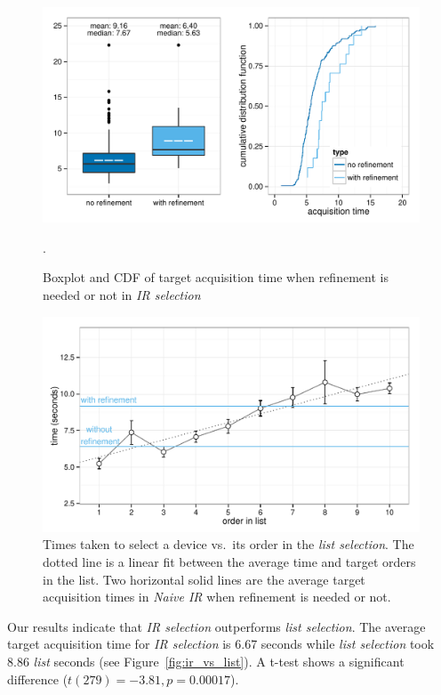 \begin{figure}[t]
\centering
\includegraphics[width=1.09\columnwidth]{figures/result_study1b.pdf}
\caption{Boxplot and CDF of target acquisition time when refinement is needed or not in {\em IR selection}}.
\label{fig:with_without_refinement}
\end{figure}

\begin{figure}[t]
\centering
\includegraphics[width=1.0\columnwidth]{figures/result_study1c.pdf}
\caption{Times taken to select a device vs.~its order in the {\em list selection}. The dotted line is a linear fit between the average time and target orders in the list. Two horizontal solid lines are the average target acquisition times in {\em Naive IR} when refinement is needed or not.}
\label{fig:time-vs-list-order}
\end{figure}

Our results indicate that {\em IR selection} outperforms {\em list selection}.  The average target acquisition time for {\em IR selection} is 6.67 seconds 
while {\em list selection} took 8.86 {\em list} seconds (see Figure~\ref{fig:ir_vs_list}). A t-test shows a significant difference ($t(279)=-3.81, p=0.00017$).

